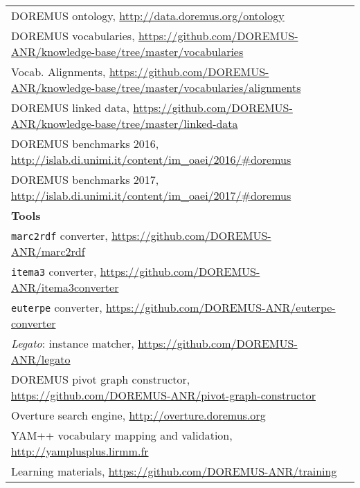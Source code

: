 \begin{table}[htbp]
\begin{center}
\begin{tabular}{ll}
DOREMUS ontology,   \url{http://data.doremus.org/ontology}  \\
DOREMUS vocabularies,  \url{https://github.com/DOREMUS-ANR/knowledge-base/tree/master/vocabularies}  \\ 
Vocab. Alignments,  \url{https://github.com/DOREMUS-ANR/knowledge-base/tree/master/vocabularies/alignments}  \\ 
DOREMUS linked data, \url{https://github.com/DOREMUS-ANR/knowledge-base/tree/master/linked-data}  \\ 
DOREMUS benchmarks 2016, \url{http://islab.di.unimi.it/content/im_oaei/2016/#doremus} \\
DOREMUS benchmarks 2017,  \url{http://islab.di.unimi.it/content/im_oaei/2017/#doremus} \\
{\bf Tools}   \\ %
{\tt marc2rdf} converter,  \url{https://github.com/DOREMUS-ANR/marc2rdf}  \\ 
{\tt itema3} converter,  \url{https://github.com/DOREMUS-ANR/itema3converter}  \\ 
{\tt euterpe} converter,  \url{https://github.com/DOREMUS-ANR/euterpe-converter}  \\ 
{\it Legato}: instance matcher,  \url{https://github.com/DOREMUS-ANR/legato}  \\ 
DOREMUS pivot graph constructor,  \url{https://github.com/DOREMUS-ANR/pivot-graph-constructor}  \\ 
{\sc Overture} search engine,  \url{http://overture.doremus.org}  \\
YAM++ vocabulary mapping and validation,  \url{http://yamplusplus.lirmm.fr}  \\ 
Learning materials, \url{https://github.com/DOREMUS-ANR/training}  \\ 
\end{tabular}
\smallskip
{}
\label{tab:links}
\end{center}
\end{table}
\vspace{-1.5cm}
